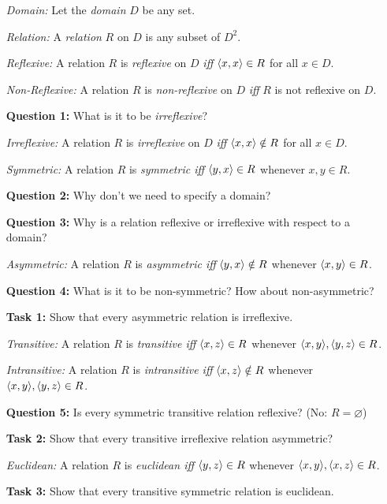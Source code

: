 \documentclass[a4paper, 11pt]{article} %
\begin{document}
\begin{enumerate}
  \item[\it Domain:] Let the \textit{domain} $D$ be any set.
  \item[\it Relation:] A \textit{relation} $R$ on $D$ is any subset of $D^2$.
  \item[\it Reflexive:] A relation $R$ is \textit{reflexive} on $D$ \textit{iff} $\langle x,x\rangle\in R$ for all $x\in D$.
  \item[\it Non-Reflexive:] A relation $R$ is \textit{non-reflexive} on $D$ \textit{iff} $R$ is not reflexive on $D$.
  \item[\bf Question 1:] What is it to be \textit{irreflexive}?
  \item[\it Irreflexive:] A relation $R$ is \textit{irreflexive} on $D$ \textit{iff} $\langle x,x\rangle\notin R$ for all $x\in D$.
  \item[\it Symmetric:] A relation $R$ is \textit{symmetric iff} $\langle y,x\rangle\in R$ whenever ${x,y}\in R$.
  \item[\bf Question 2:] Why don't we need to specify a domain?
  \item[\bf Question 3:] Why is a relation reflexive or irreflexive with respect to a domain?
  \item[\it Asymmetric:] A relation $R$ is \textit{asymmetric iff} $\langle y,x\rangle\notin R$ whenever $\langle x,y\rangle\in R$.
  \item[\bf Question 4:] What is it to be non-symmetric? How about non-asymmetric?
  \item[\bf Task 1:] Show that every asymmetric relation is irreflexive.
  \item[\it Transitive:] A relation $R$ is \textit{transitive iff} $\langle x,z\rangle\in R$ whenever $\langle x,y\rangle,\langle y,z\rangle\in R$.
  \item[\it Intransitive:] A relation $R$ is \textit{intransitive iff} $\langle x,z\rangle\notin R$ whenever $\langle x,y\rangle,\langle y,z\rangle\in R$.
  \item[\bf Question 5:] Is every symmetric transitive relation reflexive? (No: $R=\varnothing$)
  \item[\bf Task 2:] Show that every transitive irreflexive relation asymmetric?
  \item[\it Euclidean:] A relation $R$ is \textit{euclidean iff} $\langle y,z\rangle\in R$ whenever $\langle x,y\rangle,\langle x,z\rangle\in R$.
  \item[\bf Task 3:] Show that every transitive symmetric relation is euclidean.
\end{enumerate}
\end{document}
